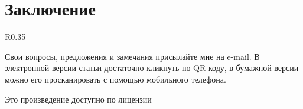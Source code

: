 \documentclass{artikel1}
\begin{document}
\section*{Заключение}

\begin{wrapfigure}[5]{R}{0.35\linewidth}
	\vspace{-7ex}
\end{wrapfigure}

Свои вопросы, предложения и замечания присылайте мне на e-mail. В электронной версии статьи достаточно кликнуть по QR-коду, в бумажной версии можно его просканировать с помощью мобильного телефона.

\vfill

\begin{center}
	Это произведение доступно по лицензии \doclicenseNameRef \\ \doclicenseImage[imagewidth=5em]
\end{center}
\end{document}

